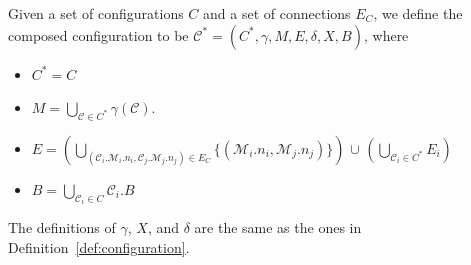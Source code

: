 \documentclass[conference]{IEEEtran}
\theoremstyle{definition}
\begin{document}
Given a set of configurations $C$ %
and a set of connections $E_C$, we define the composed configuration to be $\mathcal{C}^*=(C^*, \gamma, M, E, \delta,
X, B)$, where
\begin{itemize}
\item $C^*=C$
\item $M=\bigcup_{\mathcal{C}\in C^*}{\gamma(\mathcal{C})}$.
\item $E= (\bigcup_{(\mathcal{C}_i.\mathcal{M}_i.n_i, \mathcal{C}_j.\mathcal{M}_j.n_j)\in E_C}{\{(\mathcal{M}_i.n_i, \mathcal{M}_j.n_j)}\})$ $\cup$ $(\bigcup_{\mathcal{C}_i \in C^*}{E_{i}})$
\item \(B = \bigcup_{\mathcal{C}_i \in C} \mathcal{C}_i.B\)
\end{itemize}
The definitions of $\gamma$, \(X\), and $\delta$ are the same as the ones in Definition~\ref{def:configuration}.
% 
% 
\end{document}
